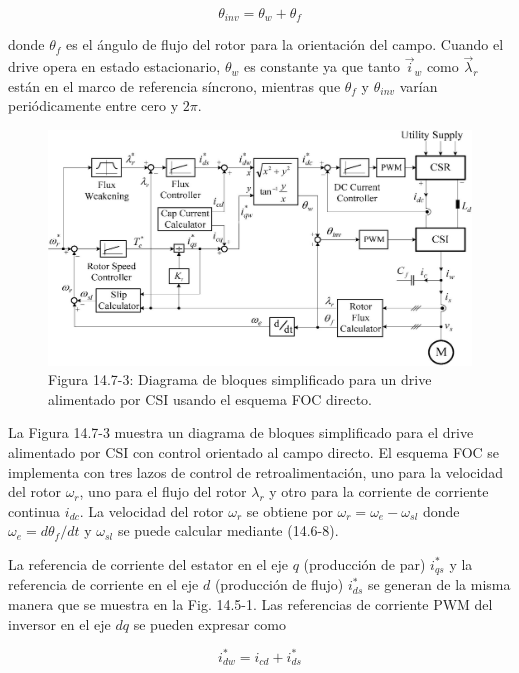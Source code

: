 \documentclass[letterpaper,12pt]{article}
\begin{document}
\begin{equation}
\theta_{inv} = \theta_{w} + \theta_{f} \tag{14.7-1}
\end{equation}

donde $\theta_{f}$ es el ángulo de flujo del rotor para la orientación del campo. Cuando el drive opera en estado estacionario, $\theta_{w}$ es constante ya que tanto $\vec{i}_w$ como $\vec{\lambda}_r$ están en el marco de referencia síncrono, mientras que $\theta_{f}$ y $\theta_{inv}$ varían periódicamente entre cero y $2\pi$.

\begin{figure}[ht]
\centering
\includegraphics{graficos/img22.jpg}
\caption{Figura 14.7-3: Diagrama de bloques simplificado para un drive alimentado por CSI usando el esquema FOC directo.}
\end{figure}
\FloatBarrier

La Figura 14.7-3 muestra un diagrama de bloques simplificado para el drive alimentado por CSI con control orientado al campo directo. El esquema FOC se implementa con tres lazos de control de retroalimentación, uno para la velocidad del rotor $\omega_r$, uno para el flujo del rotor $\lambda_r$ y otro para la corriente de corriente continua $i_{dc}$. La velocidad del rotor $\omega_r$ se obtiene por $\omega_r = \omega_e - \omega_{sl}$ donde $\omega_e = d\theta_f / dt$ y $\omega_{sl}$ se puede calcular mediante (14.6-8).

La referencia de corriente del estator en el eje $q$ (producción de par) $i_{qs}^*$ y la referencia de corriente en el eje $d$ (producción de flujo) $i_{ds}^*$ se generan de la misma manera que se muestra en la Fig. 14.5-1. Las referencias de corriente PWM del inversor en el eje $dq$ se pueden expresar como

\begin{equation}
i_{dw}^* = i_{cd} + i_{ds}^* \tag{14.7-2}
\end{equation}
\end{document}
